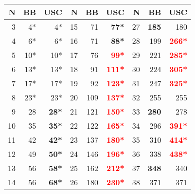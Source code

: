 \begin{tabular}{r|rr||r|rr||r|rr}
 \hline
 N&BB &USC&N&BB&USC&N&BB&USC\\
 \hline
 3&4*&4*&    15&71&\textbf{77*}&
 27&\textbf{185}&180 \\
 4&6*&6*&    16&71&\textbf{88*}&
 28&199&\textbf{\textcolor{red}{266*}} \\
 5&10*&10*&    17&76&\textbf{\textcolor{red}{99*}}&
 29&221&\textbf{\textcolor{red}{285*}} \\
 6&13*&13*&    18&91&\textbf{\textcolor{red}{111*}}&
 30&224&\textbf{\textcolor{red}{305*}} \\
 7&17*&17*&    19&92&\textbf{\textcolor{red}{123*}}&
 31&247&\textbf{\textcolor{red}{325*}} \\
 8&23*&23*&    20&109&\textbf{\textcolor{red}{137*}}&
 32&255&255 \\
 9&28&\textbf{28*}&    21&121&\textbf{\textcolor{red}{150*}}&
 33&\textbf{280}&278 \\
 10&35&\textbf{35*}&    22&122&\textbf{\textcolor{red}{165*}}&
 34&296&\textbf{\textcolor{red}{391*}} \\
 11&42&\textbf{42*}&    23&137&\textbf{\textcolor{red}{180*}}&
 35&310&\textbf{\textcolor{red}{414*}} \\
 12&49&\textbf{50*}&    24&146&\textbf{\textcolor{red}{196*}}&
 36&338&\textbf{\textcolor{red}{438*}} \\
 13&56&\textbf{58*}&    25&162&\textbf{\textcolor{red}{212*}}&
 37&\textbf{348}&340 \\
 14&56&\textbf{68*}&    26&180&\textbf{\textcolor{red}{230*}}&
 38&371&371 \\ 
\end{tabular}

